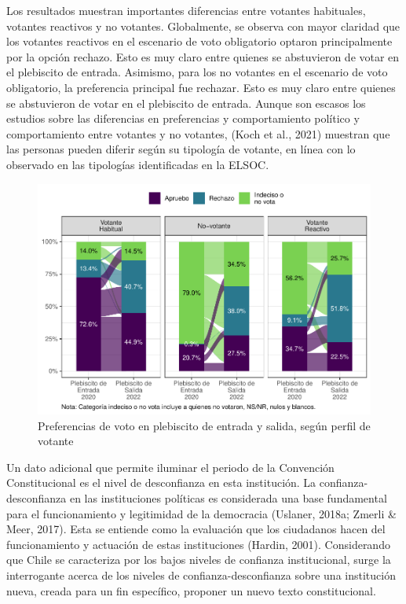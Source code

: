 \documentclass[
  12pt,
]{book}
\begin{document}
Los resultados muestran importantes diferencias entre votantes habituales, votantes reactivos y no votantes. Globalmente, se observa con mayor claridad que los votantes reactivos en el escenario de voto obligatorio optaron principalmente por la opción rechazo. Esto es muy claro entre quienes se abstuvieron de votar en el plebiscito de entrada. Asimismo, para los no votantes en el escenario de voto obligatorio, la preferencia principal fue rechazar. Esto es muy claro entre quienes se abstuvieron de votar en el plebiscito de entrada. Aunque son escasos los estudios sobre las diferencias en preferencias y comportamiento político y comportamiento entre votantes y no votantes, (Koch et al., 2021) muestran que las personas pueden diferir según su tipología de votante, en línea con lo observado en las tipologías identificadas en la ELSOC.

\begin{figure}

{\centering \includegraphics{reporte-elsoc_files/figure-latex/graf-alluvial-pleb-tipo-1} 

}

\caption{Preferencias de voto en plebiscito de entrada y salida, según perfil de votante}\label{fig:graf-alluvial-pleb-tipo}
\end{figure}

Un dato adicional que permite iluminar el periodo de la Convención Constitucional es el nivel de desconfianza en esta institución. La confianza-desconfianza en las instituciones políticas es considerada una base fundamental para el funcionamiento y legitimidad de la democracia (Uslaner, 2018a; Zmerli \& Meer, 2017). Esta se entiende como la evaluación que los ciudadanos hacen del funcionamiento y actuación de estas instituciones (Hardin, 2001). Considerando que Chile se caracteriza por los bajos niveles de confianza institucional, surge la interrogante acerca de los niveles de confianza-desconfianza sobre una institución nueva, creada para un fin específico, proponer un nuevo texto constitucional.
\end{document}
